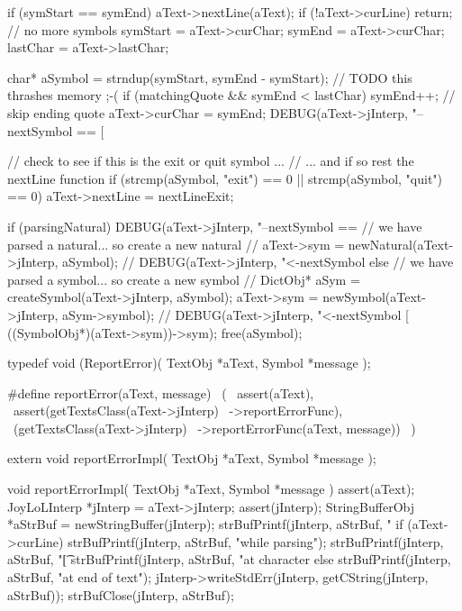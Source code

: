 {{    if (symStart == symEnd) {
      aText->nextLine(aText);
      if (!aText->curLine) return; // no more symbols
      symStart = aText->curChar;
      symEnd   = aText->curChar;
      lastChar = aText->lastChar;
    }
  }

  char* aSymbol = strndup(symStart, symEnd - symStart); // TODO this thrashes memory ;-(
  if (matchingQuote && symEnd < lastChar) symEnd++; // skip ending quote
  aText->curChar = symEnd;
  DEBUG(aText->jInterp, "--nextSymbol == [%

  // check to see if this is the exit or quit symbol ...
  // ... and if so rest the nextLine function
  if (strcmp(aSymbol, "exit") == 0 || strcmp(aSymbol, "quit") == 0) {
    aText->nextLine = nextLineExit;
  }

  if (parsingNatural) {
    DEBUG(aText->jInterp, "--nextSymbol == %
    // we have parsed a natural... so create a new natural
    //
    aText->sym = newNatural(aText->jInterp, aSymbol);
    //
    DEBUG(aText->jInterp, "<-nextSymbol %
  } else {
    // we have parsed a symbol... so create a new symbol
    //
    DictObj* aSym = createSymbol(aText->jInterp, aSymbol);
    aText->sym = newSymbol(aText->jInterp, aSym->symbol);
    //
    DEBUG(aText->jInterp, "<-nextSymbol [%
      ((SymbolObj*)(aText->sym))->sym);
  }
  free(aSymbol);
}
\stopCCode

\startCHeader
typedef void (ReportError)(
  TextObj *aText,
  Symbol  *message
);

#define reportError(aText, message)       \
  (                                       \
    assert(aText),                        \
    assert(getTextsClass(aText->jInterp)  \
      ->reportErrorFunc),                 \
    (getTextsClass(aText->jInterp)        \
      ->reportErrorFunc(aText, message))  \
  )
\stopCHeader

\setCHeaderStream{private}
\startCHeader
extern void reportErrorImpl(
  TextObj *aText,
  Symbol  *message
);
\stopCHeader
\setCHeaderStream{public}

\startCCode
void reportErrorImpl(
  TextObj *aText,
  Symbol  *message
) {
  assert(aText);
  JoyLoLInterp *jInterp = aText->jInterp;
  assert(jInterp);
  StringBufferObj *aStrBuf = 
    newStringBuffer(jInterp);
  strBufPrintf(jInterp, aStrBuf, "\n\n%
  if (aText->curLine) {
    strBufPrintf(jInterp, aStrBuf, "while parsing\n");
    strBufPrintf(jInterp, aStrBuf, "\t[%
    strBufPrintf(jInterp, aStrBuf,
      "at character %
  } else {
    strBufPrintf(jInterp, aStrBuf, "at end of text\n\n");
  }
  jInterp->writeStdErr(jInterp, getCString(jInterp, aStrBuf));
  strBufClose(jInterp, aStrBuf);
}
\stopCCode

